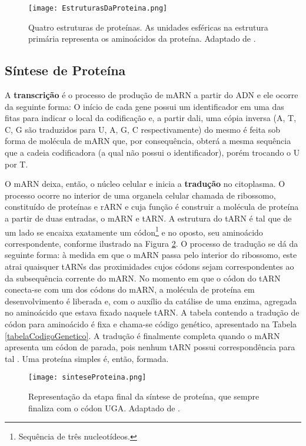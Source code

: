 \begin{figure}[h]
    \centering
    \texttt{[image: EstruturasDaProteina.png]}
    \caption{Quatro estruturas de proteínas. As unidades esféricas na estrutura primária representa os aminoácidos da proteína. Adaptado de \cite{drug09}.}
    \label{fig:EstruturasDaProteina}
\end{figure}

\subsection{Síntese de Proteína} \label{sinteseDeProteina}

\indent A \textbf{transcrição} é o processo de produção de mARN a partir do ADN e ele ocorre da seguinte forma: O início de cada gene possui um identificador em uma das fitas para indicar o local da codificação e, a partir dali, uma cópia inversa (A, T, C, G são traduzidos para U, A, G, C respectivamente) do mesmo é feita sob forma de molécula de mARN que, por consequência, obterá a mesma sequência que a cadeia codificadora (a qual não possui o identificador), porém trocando o U por T.

\indent O mARN deixa, então, o núcleo celular e inicia a \textbf{tradução} no citoplasma. O processo ocorre no interior de uma organela celular chamada de ribossomo, constituído de proteínas e rARN e cuja função é construir a molécula de proteína a partir de duas entradas, o mARN e tARN. A estrutura do tARN é tal que de um lado se encaixa exatamente um códon\footnote{Sequência de três nucleotídeos.} e no oposto, seu aminoácido correspondente, conforme ilustrado na Figura \ref{fig:sinteseProteina}. O processo de tradução se dá da seguinte forma: à medida em que o mARN passa pelo interior do ribossomo, este atrai quaisquer tARNs das proximidades cujos códons sejam correspondentes ao da subsequência corrente do mARN. No momento em que o códon do tARN conecta-se com um dos códons do mARN, a molécula de proteína em desenvolvimento é liberada e, com o auxílio da catálise de uma enzima, agregada no aminoácido que estava fixado naquele tARN. A tabela contendo a tradução de códon para aminoácido é fixa e chama-se código genético, apresentado na Tabela \ref{tabelaCodigoGenetico}. A tradução é finalmente completa quando o mARN apresenta um códon de parada, pois nenhum tARN possui correspondência para tal \cite{setubal97}. Uma proteína simples é, então, formada. 

\begin{figure}[h]
    \centering
    \texttt{[image: sinteseProteina.png]}
    \caption{Representação da etapa final da síntese de proteína, que sempre finaliza com o códon UGA. Adaptado de \cite{proteinSyntesis}.}
    \label{fig:sinteseProteina}
\end{figure} 

